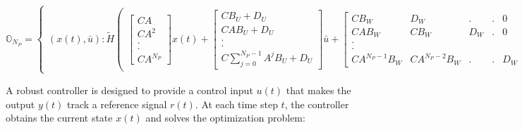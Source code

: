 \documentclass[letterpaper, 10 pt, conference]{ieeeconf}  %
\begin{document}
    \begin{table}[t]
    	\begin{equation}
    	\mathbb{O}_{N_P}= \begin{Bmatrix}
    	(x(t),\bar{u}):
    	\tilde{H}
    	\begin{pmatrix}
    	\begin{bmatrix}
    	CA \\ CA^2 \\ . \\ . \\ CA^{N_P}
    	\end{bmatrix}x(t) +
    	\begin{bmatrix}
    	CB_U+D_U \\ CAB_U+D_U \\ . \\ . \\ C\sum\limits_{j=0}^{N_P-1}A^{j}B_U + D_{U}
    	\end{bmatrix}\bar{u} + 
    	\begin{bmatrix}
    	CB_W & D_W & . & .  & 0 \\ CAB_W & CB_W & D_W & . & 0 \\ . \\ . \\ CA^{N_P-1}B_W & CA^{N_P-2}B_W & . & . & D_W
    	\end{bmatrix}
    	\begin{bmatrix}
    	w(t) \\ w(t+1) \\ . \\ . \\ w(t+N_P)
    	\end{bmatrix} 
    	\end{pmatrix}
    	\leq
    	\tilde{h}
    	\end{Bmatrix}
    	\label{full_ONP}
    	\end{equation}
    \end{table}
  A robust controller is designed to provide a control input $u(t)$ that makes the output $y(t)$ 
  track a reference signal $r(t)$. At each time step $t$, the controller obtains the current state $x(t)$ and solves the optimization problem:
\end{document}

